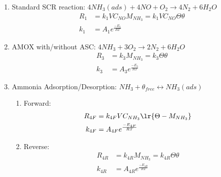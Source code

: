 \begin{enumerate}
\item Standard SCR reaction: $4 NH_3 (ads) + 4 NO + O_2 \longrightarrow 4 N_2 + 6 H_2O$
\begin{align*}
    R_1 &= k_1 V C_{NO} M_{NH_3} = k_1V C_{NO} \Theta \theta\\
    k_1 &= A_1 e^{\frac{-E_1}{RT}}
\end{align*}

\item AMOX with/without ASC: $4 NH_3 + 3 O_2 \longrightarrow 2 N_2 + 6 H_2O $
\begin{align*}
    R_3 &= k_3 M_{NH_3} = k_3 \Theta \theta\\
    k_3 &= A_3 e^{\frac{-E_3}{RT}}
\end{align*}

\item Ammonia Adsorption/Desorption: $NH_3 + \theta_{free} \longleftrightarrow NH_3(ads)$
\begin{enumerate}
\item Forward:
\begin{align*}
    R_{4F} &= k_{4F} V C_{NH_3} \lr{\Theta - M_{NH_3}}\\
    k_{4F} &= A_{4F} e^{\frac{-E_{4F}}{RT}}
\end{align*}
\item Reverse:
\begin{align*}
    R_{4R} &= k_{4R} M_{NH_3} = k_{4R} \Theta \theta \\
    k_{4R} &= A_{4R} e^{\frac{-E_{4R}}{RT}}
\end{align*}
\end{enumerate}
\end{enumerate}

